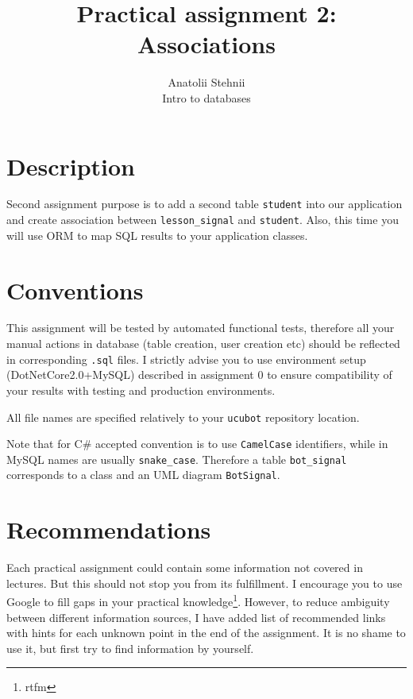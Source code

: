 \documentclass[12pt]{article}
\newcommand{\code}[1]{\texttt{#1}}
\begin{document}
\title{Practical assignment 2: Associations}
\author{Anatolii Stehnii\\Intro to databases}
\maketitle

\section*{Description}

Second assignment purpose is to add a second table \code{student} into our application and create association between \code{lesson\_signal} and \code{student}. Also, this time you will use ORM to map SQL results to your application classes.

\section*{Conventions}

This assignment will be tested by automated functional tests, therefore all your manual actions in database (table creation, user creation etc) should be reflected in corresponding \code{.sql} files. I strictly advise you to use environment setup (DotNetCore2.0+MySQL) described in assignment 0 to ensure compatibility of your results with testing and production environments.

All file names are specified relatively to your \code{ucubot} repository location.

Note that for C\# accepted convention is to use \code{CamelCase} identifiers, while in MySQL names are usually \code{snake\_case}. Therefore a table \code{bot\_signal} corresponds to a class and an UML diagram \code{BotSignal}.

\section*{Recommendations}

Each practical assignment could contain some information not covered in lectures. But this should not stop you from its fulfillment. I encourage you to use Google to fill gaps in your practical knowledge\footnote{rtfm}. However, to reduce ambiguity between different information sources, I have added list of recommended links with hints for each unknown point in the end of the assignment. It is no shame to use it, but first try to find information by yourself.
\end{document}
